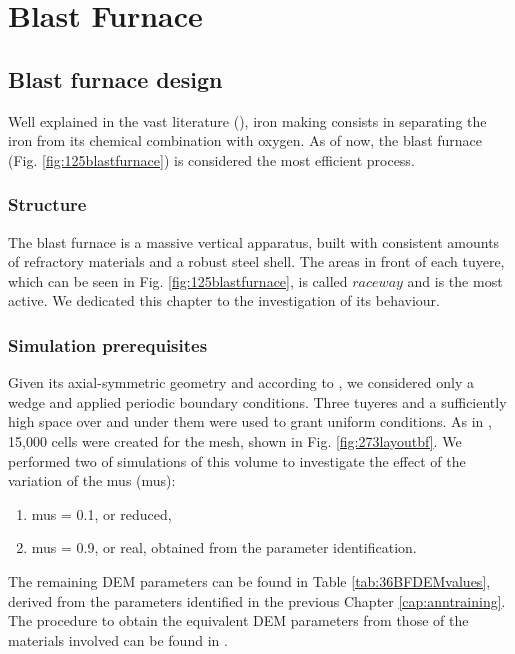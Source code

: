 
\chapter{Blast Furnace}
\label{cap:blastfurnace}

\section{Blast furnace design}
\label{sec:bfdesign}

Well explained in the vast literature (\cite{RefWorks:203}), 
iron making consists in separating the iron from its chemical combination with
oxygen. 
As of now, the blast furnace (Fig. \ref{fig:125blastfurnace}) is considered the
most efficient process.



\subsection{Structure}
\label{subsec:bfstructure}

The blast furnace is a massive vertical apparatus, built with consistent amounts
of refractory materials and a robust steel shell.
The areas in front of each tuyere, which can be seen in Fig.
\ref{fig:125blastfurnace}, is called $raceway$ and is the most active. 
We dedicated this chapter to the investigation of its behaviour.

\subsection{Simulation prerequisites}
\label{subsec:simulationprerequisites}

Given its axial-symmetric geometry and according to \citet{RefWorks:208}, we
considered only a wedge and applied periodic boundary conditions.
Three tuyeres and a sufficiently high space over and under them were used to
grant uniform conditions.
As in \citet{RefWorks:208}, 15,000 cells were created for the mesh, shown in
Fig. \ref{fig:273layoutbf}. 
We performed two of simulations of this volume to investigate the effect of the
variation of the \acl{mus} (\acs{mus}):
\begin{enumerate}
  \item{\acs{mus} = 0.1, or reduced,}
  \item{\acs{mus} = 0.9, or real, obtained from the parameter identification.}
\end{enumerate}
The remaining \acs{DEM} parameters can be found in Table
\ref{tab:36BFDEMvalues}, derived from the parameters identified in the previous
Chapter \ref{cap:anntraining}.
The procedure to obtain the equivalent \acs{DEM} parameters from those of the
materials involved can be found in \citet{RefWorks:208}.

